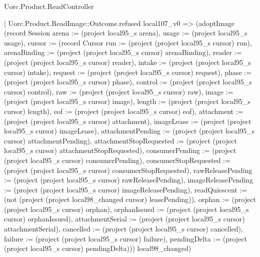 \begin{lexlean}{Uorc.Product.ReadController}
\begin{semanticmodule}
{      | Uorc.Product.ReadImage::Outcome.refused local107_v0 => (adoptImage (record Session {arena := (project local95_s arena), usage := (project local95_s usage), cursor := (record Cursor {run := (project (project local95_s cursor) run), arenaBinding := (project (project local95_s cursor) arenaBinding), reader := (project (project local95_s cursor) reader), intake := (project (project local95_s cursor) intake), request := (project (project local95_s cursor) request), phase := (project (project local95_s cursor) phase), control := (project (project local95_s cursor) control), raw := (project (project local95_s cursor) raw), image := (project (project local95_s cursor) image), length := (project (project local95_s cursor) length), eof := (project (project local95_s cursor) eof), attachment := (project (project local95_s cursor) attachment), imageLease := (project (project local95_s cursor) imageLease), attachmentPending := (project (project local95_s cursor) attachmentPending), attachmentStopRequested := (project (project local95_s cursor) attachmentStopRequested), consumerPending := (project (project local95_s cursor) consumerPending), consumerStopRequested := (project (project local95_s cursor) consumerStopRequested), rawReleasePending := (project (project local95_s cursor) rawReleasePending), imageReleasePending := (project (project local95_s cursor) imageReleasePending), readQuiescent := (not (project (project local98_changed cursor) leasePending)), orphan := (project (project local95_s cursor) orphan), orphanIssued := (project (project local95_s cursor) orphanIssued), attachmentSerial := (project (project local95_s cursor) attachmentSerial), cancelled := (project (project local95_s cursor) cancelled), failure := (project (project local95_s cursor) failure), pendingDelta := (project (project local95_s cursor) pendingDelta)})}) local98_changed)
}
\end{semanticmodule}
\end{lexlean}
